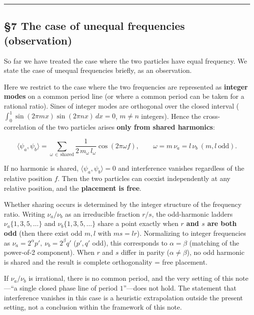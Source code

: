 \documentclass[
]{article}
\begin{document}
\begin{center}\rule{0.5\linewidth}{0.5pt}\end{center}

\subsection{§7 The case of unequal frequencies
(observation)}\label{the-case-of-unequal-frequencies-observation}

So far we have treated the case where the two particles have equal
frequency. We state the case of unequal frequencies briefly, as an
observation.

Here we restrict to the case where the two frequencies are represented
as \textbf{integer modes} on a common period line (or where a common
period can be taken for a rational ratio). Sines of integer modes are
orthogonal over the closed interval
(\(\int_0^1\sin(2\pi m x)\sin(2\pi n x)\,dx=0\), \(m\neq n\) integers).
Hence the cross-correlation of the two particles arises \textbf{only
from shared harmonics}:

\[\langle\psi_a,\psi_b\rangle=\sum_{\omega\,\in\,\text{shared}}\frac{1}{2\,m_\omega\,l_\omega}\cos(2\pi\omega f),\qquad \omega=m\,\nu_a=l\,\nu_b\ (m,l\ \text{odd}).\]

If no harmonic is shared, \(\langle\psi_a,\psi_b\rangle=0\) and
interference vanishes regardless of the relative position \(f\). Then
the two particles can coexist independently at any relative position,
and the \textbf{placement is free}.

Whether sharing occurs is determined by the integer structure of the
frequency ratio. Writing \(\nu_a/\nu_b\) as an irreducible fraction
\(r/s\), the odd-harmonic ladders \(\nu_a\{1,3,5,\dots\}\) and
\(\nu_b\{1,3,5,\dots\}\) share a point exactly when \textbf{\(r\) and
\(s\) are both odd} (then there exist odd \(m,l\) with \(m s=l r\)).
Normalizing to integer frequencies as
\(\nu_a=2^{\alpha}p',\ \nu_b=2^{\beta}q'\) (\(p',q'\) odd), this
corresponds to \(\alpha=\beta\) (matching of the power-of-2 component).
When \(r\) and \(s\) differ in parity (\(\alpha\neq\beta\)), no odd
harmonic is shared and the result is complete orthogonality = free
placement.

If \(\nu_a/\nu_b\) is irrational, there is no common period, and the
very setting of this note---``a single closed phase line of period
\(1\)''---does not hold. The statement that interference vanishes in
this case is a heuristic extrapolation outside the present setting, not
a conclusion within the framework of this note.
\end{document}
